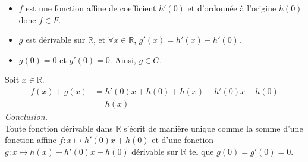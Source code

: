\documentclass[10pt]{article}
\begin{document}
\begin{tcolorbox}[enhanced, width=6in, center, size=fbox, fontupper=\large, drop shadow southwest]
\begin{equation*}
    \end{equation*}
    \begin{itemize}
        \item $f$ est une fonction affine de coefficient $h'(0)$ et d'ordonnée à l'origine $h(0)$ donc $f\in F$.
        \item $g$ est dérivable sur $\mathbb{R}$, et $\forall{x\in\mathbb{R}}$, $g'(x)=h'(x)-h'(0)$.
        \item $g(0)=0$ et $g'(0)=0$. Ainsi, $g\in G$.
    \end{itemize}
    Soit $x\in\mathbb{R}$.
    \begin{align*}
        f(x) + g(x) 
        &= h'(0)x + h(0) + h(x) - h'(0)x - h(0)\\
        &= h(x)
    \end{align*}
    \emph{Conclusion.}\\
    Toute fonction dérivable dans $\mathbb{R}$ s'écrit de manière unique comme la somme d'une fonction affine $f:x\mapsto h'(0)x+h(0)$ et d'une fonction $g:x\mapsto h(x)-h'(0)x-h(0)$ dérivable sur $\mathbb{R}$ tel que $g(0)=g'(0)=0$.
\end{tcolorbox}
\end{document}
